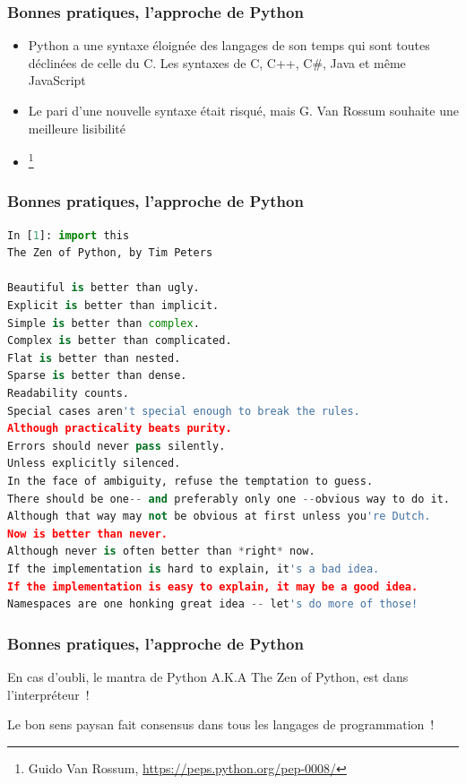 \documentclass{beamer}
\begin{document}
    \begin{frame}
        \transdissolve
        \frametitle{Bonnes pratiques, l'approche de Python}
        \begin{itemize}
            \item Python a une syntaxe éloignée des langages de son temps qui sont toutes déclinées de celle du C. Les syntaxes de C, C++, C\#, Java et même JavaScript
            \item Le pari d'une nouvelle syntaxe était risqué, mais G. Van Rossum souhaite une meilleure lisibilité
            \item {}\footnote{Guido Van Rossum, \url{https://peps.python.org/pep-0008/}}
        \end{itemize}
    \end{frame}

    \begin{frame}[fragile]
        \transdissolve
        \frametitle{Bonnes pratiques, l'approche de Python}
        \begin{lstlisting}[language=python]
In [1]: import this
The Zen of Python, by Tim Peters

Beautiful is better than ugly.
Explicit is better than implicit.
Simple is better than complex.
Complex is better than complicated.
Flat is better than nested.
Sparse is better than dense.
Readability counts.
Special cases aren't special enough to break the rules.
Although practicality beats purity.
Errors should never pass silently.
Unless explicitly silenced.
In the face of ambiguity, refuse the temptation to guess.
There should be one-- and preferably only one --obvious way to do it.
Although that way may not be obvious at first unless you're Dutch.
Now is better than never.
Although never is often better than *right* now.
If the implementation is hard to explain, it's a bad idea.
If the implementation is easy to explain, it may be a good idea.
Namespaces are one honking great idea -- let's do more of those!
        \end{lstlisting}
    \end{frame}

    \begin{frame}[fragile]
        \transdissolve
        \frametitle{Bonnes pratiques, l'approche de Python}
        En cas d'oubli, le mantra de Python A.K.A The Zen of Python, est dans l'interpréteur~!

        \bigbreak

        Le bon sens paysan fait consensus dans tous les langages de programmation~!

    \end{frame}
\end{document}
